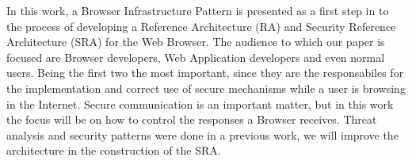 \documentclass{sig-alternate-05-2015}
\begin{document}
In this work, a Browser Infrastructure Pattern is presented as a first step in to the process of developing a Reference Architecture (RA) and Security Reference Architecture (SRA) for the Web Browser. The audience to which our paper is focused are Browser developers, Web Application developers and even normal users. Being the first two the most important, since they are the responsabiles for the implementation and correct use of secure mechanisms while a user is browsing in the Internet. Secure communication is an important matter, but in this work the focus will be on how to control the responses a Browser receives. Threat analysis and security patterns were done in a previous work, we will improve the architecture in the construction of the SRA. 



\end{document}
